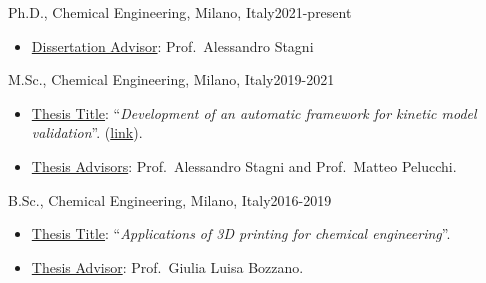 \begin{position}{Ph.D., Chemical Engineering}{\polimi, Milano, Italy}{2021-present}
    \begin{itemize}
        \item[ ] \ul{Dissertation Advisor}: Prof.\ Alessandro Stagni
    \end{itemize}
\end{position}

\begin{position}{M.Sc., Chemical Engineering}{\polimi, Milano, Italy}{2019-2021}
    \begin{itemize}
        \item[ ] \ul{Thesis Title}: ``{\it Development of an automatic framework for kinetic
              model validation}''. (\href{https://hdl.handle.net/10589/179004}{link}).
        \item[ ] \ul{Thesis Advisors}: Prof.\ Alessandro Stagni and Prof.\ Matteo Pelucchi.
    \end{itemize}
\end{position}

\begin{position}{B.Sc., Chemical Engineering}{\polimi, Milano, Italy}{2016-2019}
    \begin{itemize}
        \item[ ] \ul{Thesis Title}: ``{\it Applications of 3D printing for chemical engineering}''.
        \item[ ] \ul{Thesis Advisor}: Prof.\ Giulia Luisa Bozzano.
    \end{itemize}
\end{position}

